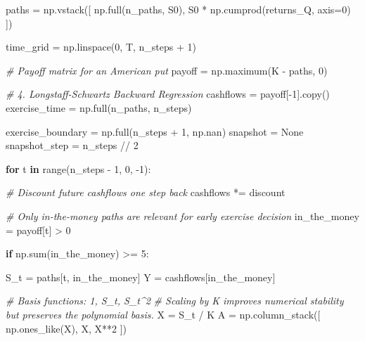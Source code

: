 \documentclass[
  11pt,
]{article}
\newenvironment{Shaded}{}{}
\newcommand{\BuiltInTok}[1]{\textcolor[rgb]{0.00,0.50,0.00}{#1}}
\newcommand{\CommentTok}[1]{\textcolor[rgb]{0.38,0.63,0.69}{\textit{#1}}}
\newcommand{\ControlFlowTok}[1]{\textcolor[rgb]{0.00,0.44,0.13}{\textbf{#1}}}
\newcommand{\DecValTok}[1]{\textcolor[rgb]{0.25,0.63,0.44}{#1}}
\newcommand{\KeywordTok}[1]{\textcolor[rgb]{0.00,0.44,0.13}{\textbf{#1}}}
\newcommand{\NormalTok}[1]{#1}
\newcommand{\OperatorTok}[1]{\textcolor[rgb]{0.40,0.40,0.40}{#1}}
\newcommand{\VariableTok}[1]{\textcolor[rgb]{0.10,0.09,0.49}{#1}}
\begin{document}
\begin{Shaded}
\begin{Highlighting}[]
\NormalTok{paths }\OperatorTok{=}\NormalTok{ np.vstack([}
\NormalTok{    np.full(n\_paths, S0),}
\NormalTok{    S0 }\OperatorTok{*}\NormalTok{ np.cumprod(returns\_Q, axis}\OperatorTok{=}\DecValTok{0}\NormalTok{)}
\NormalTok{])}

\NormalTok{time\_grid }\OperatorTok{=}\NormalTok{ np.linspace(}\DecValTok{0}\NormalTok{, T, n\_steps }\OperatorTok{+} \DecValTok{1}\NormalTok{)}

\CommentTok{\# Payoff matrix for an American put}
\NormalTok{payoff }\OperatorTok{=}\NormalTok{ np.maximum(K }\OperatorTok{{-}}\NormalTok{ paths, }\DecValTok{0}\NormalTok{)}

\CommentTok{\# 4. Longstaff{-}Schwartz Backward Regression}
\NormalTok{cashflows }\OperatorTok{=}\NormalTok{ payoff[}\OperatorTok{{-}}\DecValTok{1}\NormalTok{].copy()}
\NormalTok{exercise\_time }\OperatorTok{=}\NormalTok{ np.full(n\_paths, n\_steps)}

\NormalTok{exercise\_boundary }\OperatorTok{=}\NormalTok{ np.full(n\_steps }\OperatorTok{+} \DecValTok{1}\NormalTok{, np.nan)}
\NormalTok{snapshot }\OperatorTok{=} \VariableTok{None}
\NormalTok{snapshot\_step }\OperatorTok{=}\NormalTok{ n\_steps }\OperatorTok{//} \DecValTok{2}

\ControlFlowTok{for}\NormalTok{ t }\KeywordTok{in} \BuiltInTok{range}\NormalTok{(n\_steps }\OperatorTok{{-}} \DecValTok{1}\NormalTok{, }\DecValTok{0}\NormalTok{, }\OperatorTok{{-}}\DecValTok{1}\NormalTok{):}

    \CommentTok{\# Discount future cashflows one step back}
\NormalTok{    cashflows }\OperatorTok{*=}\NormalTok{ discount}

    \CommentTok{\# Only in{-}the{-}money paths are relevant for early exercise decision}
\NormalTok{    in\_the\_money }\OperatorTok{=}\NormalTok{ payoff[t] }\OperatorTok{\textgreater{}} \DecValTok{0}

    \ControlFlowTok{if}\NormalTok{ np.}\BuiltInTok{sum}\NormalTok{(in\_the\_money) }\OperatorTok{\textgreater{}=} \DecValTok{5}\NormalTok{:}

\NormalTok{        S\_t }\OperatorTok{=}\NormalTok{ paths[t, in\_the\_money]}
\NormalTok{        Y }\OperatorTok{=}\NormalTok{ cashflows[in\_the\_money]}

        \CommentTok{\# Basis functions: 1, S\_t, S\_t\^{}2}
        \CommentTok{\# Scaling by K improves numerical stability but preserves the polynomial basis.}
\NormalTok{        X }\OperatorTok{=}\NormalTok{ S\_t }\OperatorTok{/}\NormalTok{ K}
\NormalTok{        A }\OperatorTok{=}\NormalTok{ np.column\_stack([}
\NormalTok{            np.ones\_like(X),}
\NormalTok{            X,}
\NormalTok{            X}\OperatorTok{**}\DecValTok{2}
\NormalTok{        ])}


\end{Highlighting}
\end{Shaded}
\end{document}
